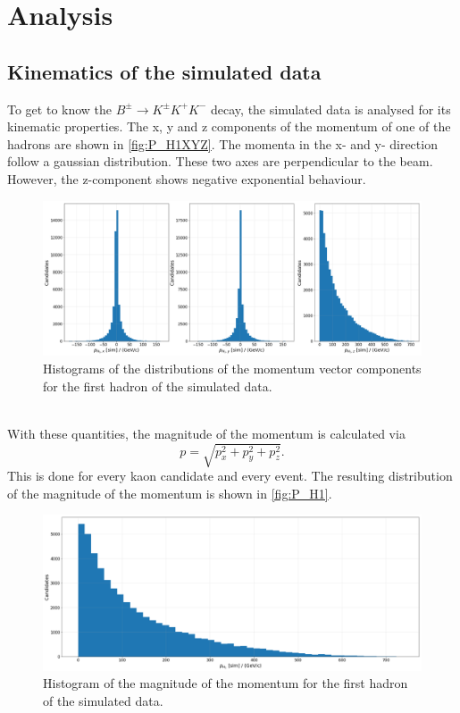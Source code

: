 \section{Analysis}
\label{sec:Analysis}

\subsection{Kinematics of the simulated data}
\label{sec:simdata}
To get to know the $B^{\pm} \to K^{\pm}K^+K^-$ decay, the simulated data is analysed for its kinematic properties. The x, y and z components of the momentum
of one of the hadrons are shown in \autoref{fig:P_H1XYZ}. The momenta in the x- and y- direction follow a gaussian distribution. These two axes are perpendicular
to the beam. However, the z-component shows negative exponential behaviour.
\begin{figure}
  \centering
  \includegraphics[width = .95\textwidth]{"content/pics/P_H1XYZ.png"}

  \caption{Histograms of the distributions of the momentum vector components for the first hadron of the simulated data.}
  \label{fig:P_H1XYZ}
\end{figure}
\\ With these quantities, the magnitude of the momentum is calculated via 
\begin{equation}
  \label{eq:magn_p}
    p = \sqrt{p_x^2 + p_y^2 + p_z^2}.
\end{equation}
This is done for every kaon candidate and every event.
The resulting distribution of the magnitude of the momentum is shown in \autoref{fig:P_H1}.
\begin{figure}
  \centering
  \includegraphics[width = .7\textwidth]{"content/pics/P_H1.png"}
  \caption{Histogram of the magnitude of the momentum for the first hadron of the simulated data.}
  \label{fig:P_H1}
\end{figure}
